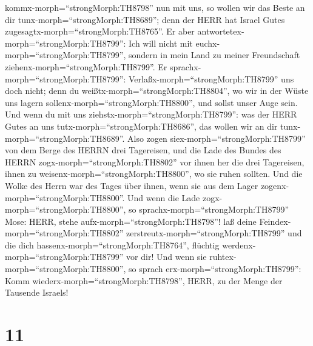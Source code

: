 kommx-morph=``strongMorph:TH8798'' nun mit uns, so wollen wir das Beste
an dir tunx-morph=``strongMorph:TH8689''; denn der HERR hat Israel Gutes
zugesagtx-morph=``strongMorph:TH8765''.  Er aber
antwortetex-morph=``strongMorph:TH8799'': Ich will nicht mit
euchx-morph=``strongMorph:TH8799'', sondern in mein Land zu meiner
Freundschaft ziehenx-morph=``strongMorph:TH8799''.  Er
sprachx-morph=``strongMorph:TH8799'':
Verlaßx-morph=``strongMorph:TH8799'' uns doch nicht; denn du
weißtx-morph=``strongMorph:TH8804'', wo wir in der Wüste uns lagern
sollenx-morph=``strongMorph:TH8800'', und sollst unser Auge sein.
 Und wenn du mit uns ziehstx-morph=``strongMorph:TH8799'':
was der HERR Gutes an uns tutx-morph=``strongMorph:TH8686'', das wollen
wir an dir tunx-morph=``strongMorph:TH8689''.  Also zogen
siex-morph=``strongMorph:TH8799'' von dem Berge des HERRN drei
Tagereisen, und die Lade des Bundes des HERRN
zogx-morph=``strongMorph:TH8802'' vor ihnen her die drei Tagereisen,
ihnen zu weisenx-morph=``strongMorph:TH8800'', wo sie ruhen sollten.
 Und die Wolke des Herrn war des Tages über ihnen, wenn sie
aus dem Lager zogenx-morph=``strongMorph:TH8800''.  Und
wenn die Lade zogx-morph=``strongMorph:TH8800'', so
sprachx-morph=``strongMorph:TH8799'' Mose: HERR, stehe
aufx-morph=``strongMorph:TH8798''! laß deine
Feindex-morph=``strongMorph:TH8802''
zerstreutx-morph=``strongMorph:TH8799'' und die dich
hassenx-morph=``strongMorph:TH8764'', flüchtig
werdenx-morph=``strongMorph:TH8799'' vor dir!  Und wenn sie
ruhtex-morph=``strongMorph:TH8800'', so sprach
erx-morph=``strongMorph:TH8799'': Komm
wiederx-morph=``strongMorph:TH8798'', HERR, zu der Menge der Tausende
Israels!

\hypertarget{section-10}{%
\section{11}\label{section-10}}

